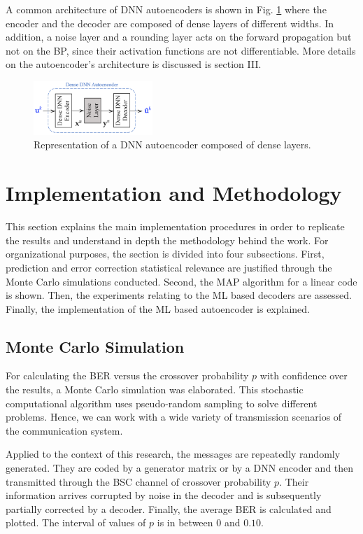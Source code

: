 \documentclass[conference]{IEEEtran}
\begin{document}
A common architecture of DNN autoencoders is shown in Fig. \ref{fig:DDNNAutoencoder} where the encoder and the decoder are composed of dense layers of different widths. In addition, a noise layer and a rounding layer acts on the forward propagation but not on the BP, since their activation functions are not differentiable. More details on the autoencoder's architecture is discussed is section III.  


\begin{figure}[!ht]
  \centering
    \includegraphics[width=0.4\textwidth]{images/DNN_autoencoder}
    \caption{Representation of a DNN autoencoder composed of dense layers.}\label{fig:DDNNAutoencoder}
\end{figure}



\section{Implementation and Methodology}
This section explains the main implementation procedures in order to replicate the results and understand in depth the methodology behind the work. For organizational purposes, the section is divided into four subsections. First, prediction and error correction statistical relevance are justified through the Monte Carlo simulations conducted. Second, the MAP algorithm for a linear code is shown. Then, the experiments relating to the ML based decoders are assessed. Finally, the implementation of the ML based autoencoder is explained. 

\subsection{Monte Carlo Simulation}

For calculating the BER versus the crossover probability $p$ with confidence over the results, a Monte Carlo simulation was elaborated. This stochastic computational algorithm uses pseudo-random sampling to solve different problems. Hence, we can work with a wide variety of transmission scenarios of the communication system.

Applied to the context of this research, the messages are repeatedly randomly generated. They are coded by a generator matrix or by a DNN encoder and then transmitted through the BSC channel of crossover probability $p$. Their information arrives corrupted by noise in the decoder and is subsequently partially corrected by a decoder. Finally, the average BER is calculated and plotted. The interval of values of $p$ is in between $0$ and $0.10$.
\end{document}
